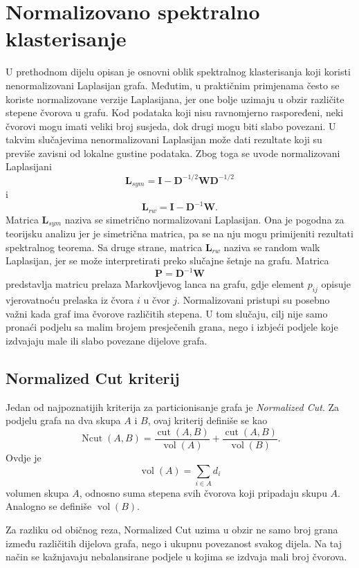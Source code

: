 \section{Normalizovano spektralno klasterisanje}
U prethodnom dijelu opisan je osnovni oblik spektralnog klasterisanja koji koristi nenormalizovani Laplasijan grafa. Međutim, u praktičnim primjenama često se koriste normalizovane verzije Laplasijana, jer one bolje uzimaju u obzir različite stepene čvorova u grafu.
Kod podataka koji nisu ravnomjerno raspoređeni, neki čvorovi mogu imati veliki broj susjeda, dok drugi mogu biti slabo povezani. U takvim slučajevima nenormalizovani Laplasijan može dati rezultate koji su previše zavisni od lokalne gustine podataka. Zbog toga se uvode normalizovani Laplasijani
\[
    \mathbf{L}_{sym}
    =
    \mathbf{I} - \mathbf{D}^{-1/2}\mathbf{W}\mathbf{D}^{-1/2}
\]
i
\[
    \mathbf{L}_{rw}
    =
    \mathbf{I} - \mathbf{D}^{-1}\mathbf{W}.
\]
Matrica \(\mathbf{L}_{sym}\) naziva se simetrično normalizovani Laplasijan. Ona je pogodna za teorijsku analizu jer je simetrična matrica, pa se na nju mogu primijeniti rezultati spektralnog teorema. Sa druge strane, matrica \(\mathbf{L}_{rw}\) naziva se random walk Laplasijan, jer se može interpretirati preko slučajne šetnje na grafu. Matrica
\[
    \mathbf{P} = \mathbf{D}^{-1}\mathbf{W}
\]
predstavlja matricu prelaza Markovljevog lanca na grafu, gdje element \(p_{ij}\) opisuje vjerovatnoću prelaska iz čvora \(i\) u čvor \(j\).
Normalizovani pristupi su posebno važni kada graf ima čvorove različitih stepena. U tom slučaju, cilj nije samo pronaći podjelu sa malim brojem presječenih grana, nego i izbjeći podjele koje izdvajaju male ili slabo povezane dijelove grafa.
\subsection{Normalized Cut kriterij}
Jedan od najpoznatijih kriterija za particionisanje grafa je \textit{Normalized Cut}. Za podjelu grafa na dva skupa \(A\) i \(B\), ovaj kriterij definiše se kao
\[
    \operatorname{Ncut}(A,B)
    =
    \frac{\operatorname{cut}(A,B)}{\operatorname{vol}(A)}
    +
    \frac{\operatorname{cut}(A,B)}{\operatorname{vol}(B)}.
\]
Ovdje je
\[
    \operatorname{vol}(A)=\sum_{i\in A} d_i
\]
volumen skupa \(A\), odnosno suma stepena svih čvorova koji pripadaju skupu \(A\). Analogno se definiše \(\operatorname{vol}(B)\).

Za razliku od običnog reza, Normalized Cut uzima u obzir ne samo broj grana između različitih dijelova grafa, nego i ukupnu povezanost svakog dijela. Na taj način se kažnjavaju nebalansirane podjele u kojima se izdvaja mali broj čvorova.

